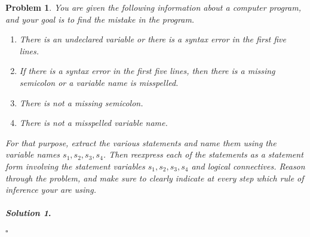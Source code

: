 \documentclass{amsart}
\theoremstyle{plain}
\newtheorem{problem}{Problem}
\newenvironment{solution}{\paragraph{\emph{Solution 1}.}}{\hfill$\square$}
\begin{document}
\begin{problem}
You are given the following information about a computer program, and your goal is to find the mistake in the program.
\begin{enumerate}
\item There is an undeclared variable or there is a syntax error in the first five lines.
\item If there is a syntax error in the first five lines, then there is a missing semicolon or a variable name is misspelled.
\item There is not a missing semicolon.
\item There is not a misspelled variable name.
\end{enumerate}
For that purpose, extract the various statements and name them using the variable names $s_{1}, s_{2}, s_{3}, s_{4}$.  Then reexpress each of the statements as a statement form involving the statement variables $s_{1},s_{2},s_{3}, s_{4}$ and logical connectives.  Reason through the problem, and make sure to clearly indicate at every step which rule of inference your are using.
\end{problem}

\begin{solution}

\end{solution}
\end{document}
